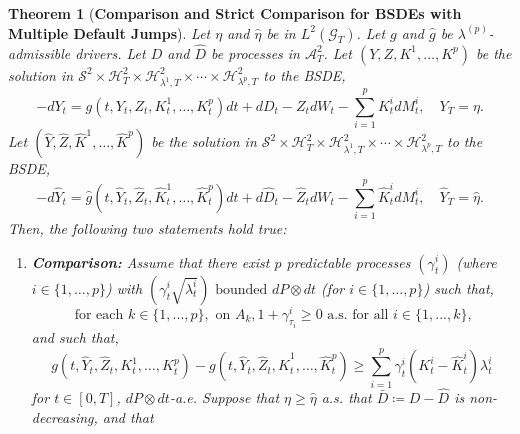 \documentclass[11pt,a4paper]{article}
\numberwithin{equation}{section}
\theoremstyle{newPlain}
\newtheorem{theorem}{Theorem}[section]
\theoremstyle{newDefinition}
\theoremstyle{newRemark}
\begin{document}
{\begin{theorem}[\textbf{Comparison and Strict Comparison for BSDEs with Multiple Default Jumps}]\label{thm:CompThm}
    Let $\eta$ and $\hat{\eta}$ be in $L^2(\mathcal{G}_T)$. Let $g$ and $\hat{g}$ be $\lambda^{(p)}$-admissible drivers. Let $D$ and $\hat{D}$ be  processes in $\mathcal{A}_{T}^2$. Let $(Y,Z,K^1,\ldots,K^p)$ be the solution in $\mathcal{S}^2\times\mathcal{H}_T^2\times\mathcal{H}_{\lambda^1,T}^2\times\cdots\times\mathcal{H}_{\lambda^p,T}^2$ to the BSDE,
    \begin{equation*}
        -dY_t = g(t,Y_t,Z_t,K_t^1,\ldots,K_t^p)dt + dD_t - Z_tdW_t - \sum_{i=1}^pK_t^idM_t^i,\quad Y_T =\eta.
    \end{equation*}
    Let $(\hat{Y},\hat{Z},\hat{K}^1,\ldots,\hat{K}^p)$ be the solution in $\mathcal{S}^2\times\mathcal{H}_T^2\times\mathcal{H}_{\lambda^1,T}^2\times\cdots\times\mathcal{H}_{\lambda^p,T}^2$ to the BSDE,
    \begin{equation*}
        -d\hat{Y}_t = \hat{g}(t,\hat{Y}_t,\hat{Z}_t,\hat{K}_t^1,\ldots,\hat{K}_t^p)dt + d\hat{D}_t - \hat{Z}_tdW_t - \sum_{i=1}^p\hat{K}_t^idM_t^i,\quad \hat{Y}_T =\hat{\eta}.
    \end{equation*}
    Then, the following two statements hold true:
    \begin{enumerate}[label=(\roman*)]
        \item \textbf{Comparison:} Assume that there exist $p$ predictable processes $(\gamma_t^i)$ (where $i\in\{1,\ldots,p\}$) with      $(\gamma_t^i\sqrt{\lambda_t^i})\text{  bounded }dP\otimes dt$  (for  $i\in\{1,\ldots,p\}$) such that,
        \begin{equation}\label{eq:CompThm1}
       \text{ for each  } k\in\{1,...,p\},  \text{ on } A_k, 1+\gamma_{\tau_i}^i\ge0 \text{ a.s.  for all } i\in\{1,...,k\},
        \end{equation}
        and such that,
        \begin{equation}\label{eq:CompThm2}
            g(t,\hat{Y}_t,\hat{Z}_t,K_t^1,\ldots,K_t^p) - g(t,\hat{Y}_t,\hat{Z}_t,\hat{K}_t^1,\ldots,\hat{K}_t^p) \ge \sum_{i=1}^p\gamma_t^i(K_t^i-\hat{K}_t^i)\lambda_t^i
        \end{equation}
        for $t\in[0,T]$, $dP\otimes dt$-a.e. Suppose that $\eta\ge\hat{\eta}$ a.s.  that $\bar{D}\coloneqq D - \hat{D}$ is non-decreasing, and that
        \begin{equation}\label{eq:CompThm3}

\end{equation}
\end{enumerate}
\end{theorem}}
\end{document}
